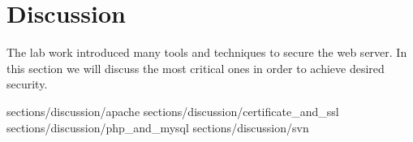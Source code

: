 \section {Discussion}

The lab work introduced many tools and techniques to secure the web server. In this section we will discuss the most critical ones in order to achieve desired security. 


 {sections/discussion/apache}
 {sections/discussion/certificate_and_ssl}
 {sections/discussion/php_and_mysql}
 {sections/discussion/svn} %

